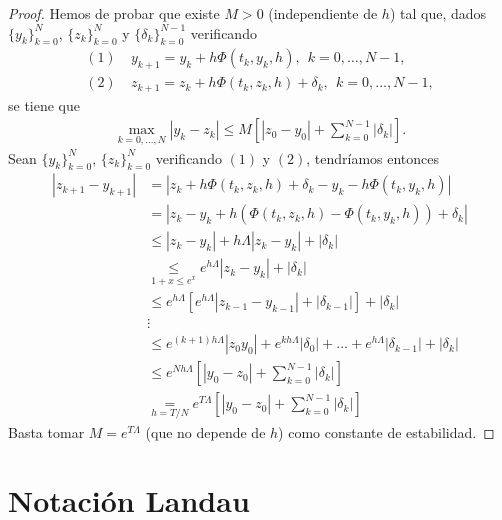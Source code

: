 \begin{proof}
Hemos de probar que existe $M > 0$ (independiente de $h$) tal que, dados $\{y_k\}_{k=0}^{N}$, $\{z_k\}_{k=0}^{N}$ y $\{\delta_k\}_{k=0}^{N-1}$ verificando
    \begin{align*}
       (1) & \ y_{k+1} = y_k + h\Phi(t_k,y_k,h), \ \ k = 0,\ldots,N-1, \\
        (2) &\ z_{k+1} = z_k + h\Phi(t_k,z_k,h) + \delta_k, \ \ k = 0,\ldots,N-1,
    \end{align*}
    se tiene que
    \begin{align*}
        \max_{k=0,\ldots,N} |y_k - z_k| \leq M\left[ |z_0 - y_0| + \sum_{k=0}^{N-1} |\delta_k| \right].
    \end{align*}
    Sean $\{y_k\}_{k=0}^{N}$, $\{z_k\}_{k=0}^{N}$ verificando $(1)$ y $(2)$, tendríamos entonces
    \begin{align*}
        |z_{k+1} - y_{k+1}| &= |z_k + h\Phi(t_k,z_k,h) + \delta_k - y_k - h \Phi(t_k,y_k,h)| \\
        &= |z_k -  y_k + h(\Phi(t_k,z_k,h) - \Phi(t_k,y_k,h)) +\delta_k| \\
        & \leq |z_k - y_k| + h\Lambda|z_k - y_k| + |\delta_k| \\
        & \underset{1 + x \leq e^x}{\leq} e^{h \Lambda} |z_k - y_k| + |\delta_k| \\
        & \leq e^{h\Lambda} [e^{h\Lambda}|z_{k-1} - y_{k-1}| + |\delta_{k-1}|] + |\delta_k| \\
        & \vdots \\
        & \leq e^{(k+1)h\Lambda}|z_0 y_0| + e^{kh\Lambda}|\delta_0| + \ldots + e^{h\Lambda}|\delta_{k-1}| + |\delta_k| \\
        & \leq e^{Nh\Lambda}\left[ |y_0 - z_0| + \sum_{k=0}^{N-1} |\delta_k| \right] \\
        & \underset{h = T/N}{=} e^{T\Lambda}\left[ |y_0 - z_0| + \sum_{k=0}^{N-1} |\delta_k| \right]
    \end{align*}
    Basta tomar $M = e^{T\Lambda}$ (que no depende de $h$) como constante de estabilidad.
\end{proof}

\section{Notación Landau}

